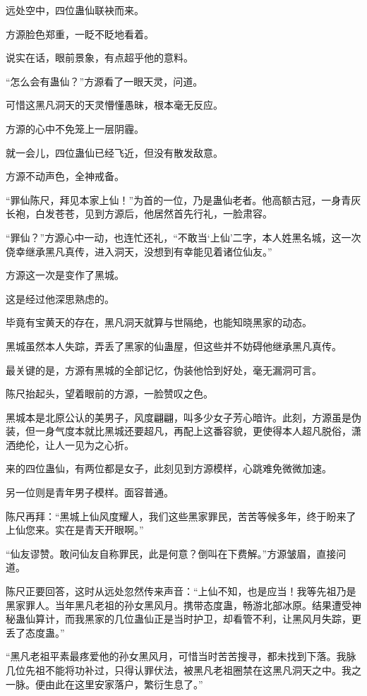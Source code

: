 
\begin{this_body}

远处空中，四位蛊仙联袂而来。

方源脸色郑重，一眨不眨地看着。

说实在话，眼前景象，有点超乎他的意料。

“怎么会有蛊仙？”方源看了一眼天灵，问道。

可惜这黑凡洞天的天灵懵懂愚昧，根本毫无反应。

方源的心中不免笼上一层阴霾。

就一会儿，四位蛊仙已经飞近，但没有散发敌意。

方源不动声色，全神戒备。

“罪仙陈尺，拜见本家上仙！”为首的一位，乃是蛊仙老者。他高额古冠，一身青灰长袍，白发苍苍，见到方源后，他居然首先行礼，一脸肃容。

“罪仙？”方源心中一动，也连忙还礼，“不敢当‘上仙’二字，本人姓黑名城，这一次侥幸继承黑凡真传，进入洞天，没想到有幸能见着诸位仙友。”

方源这一次是变作了黑城。

这是经过他深思熟虑的。

毕竟有宝黄天的存在，黑凡洞天就算与世隔绝，也能知晓黑家的动态。

黑城虽然本人失踪，弄丢了黑家的仙蛊屋，但这些并不妨碍他继承黑凡真传。

最关键的是，方源有黑城的全部记忆，伪装他恰到好处，毫无漏洞可言。

陈尺抬起头，望着眼前的方源，一脸赞叹之色。

黑城本是北原公认的美男子，风度翩翩，叫多少女子芳心暗许。此刻，方源虽是伪装，但一身气度本就比黑城还要超凡，再配上这番容貌，更使得本人超凡脱俗，潇洒绝伦，让人一见为之心折。

来的四位蛊仙，有两位都是女子，此刻见到方源模样，心跳难免微微加速。

另一位则是青年男子模样。面容普通。

陈尺再拜：“黑城上仙风度耀人，我们这些黑家罪民，苦苦等候多年，终于盼来了上仙您来。实在是青天开眼啊。”

“仙友谬赞。敢问仙友自称罪民，此是何意？倒叫在下费解。”方源皱眉，直接问道。

陈尺正要回答，这时从远处忽然传来声音：“上仙不知，也是应当！我等先祖乃是黑家罪人。当年黑凡老祖的孙女黑风月。携带态度蛊，畅游北部冰原。结果遭受神秘蛊仙算计，而我黑家的几位蛊仙正是当时护卫，却看管不利，让黑风月失踪，更丢了态度蛊。”

“黑凡老祖平素最疼爱他的孙女黑风月，可惜当时苦苦搜寻，都未找到下落。我脉几位先祖不能将功补过，只得认罪伏法，被黑凡老祖圈禁在这黑凡洞天之中。我之一脉。便由此在这里安家落户，繁衍生息了。”


\end{this_body}
